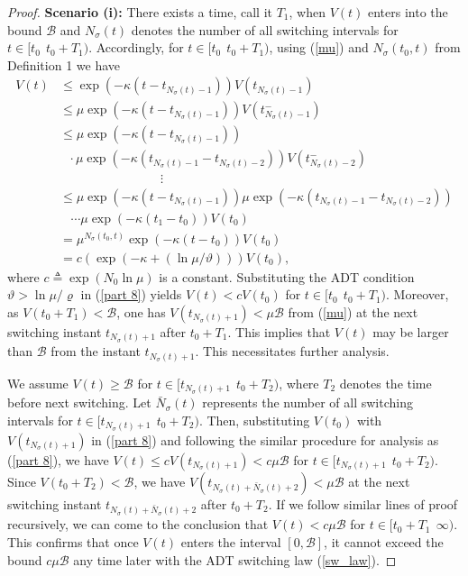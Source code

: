 \begin{proof}
	\textbf{Scenario (i):}
	There exists a time, call it $T_1$, when $V(t)$ enters into the bound $\mathcal{B}$ %
	and $N_{\sigma}(t)$ denotes the number of all switching intervals for $t \in [t_0 ~~t_0+T_1)$. Accordingly, for $t \in [t_0 ~~t_0+T_1)$, using (\ref{mu}) and $N_{\sigma}(t_0,t)$ from Definition 1 we have
	\begin{align}
	V(t)   &\leq \exp \left( - \kappa (t-t_{N_\sigma(t)-1})\right) V(t_{N_\sigma(t)-1}) \nonumber\\
	& \leq \mu\exp \left( - \kappa (t-t_{N_\sigma(t)-1})\right) V(t_{N_\sigma(t)-1}^{-}) \nonumber\\
	& \leq \mu\exp \left( - \kappa (t-t_{N_\sigma(t)-1})\right) \nonumber\\
	&~~~\cdot \mu\exp \left( - \kappa (t_{N_\sigma(t)-1}-t_{N_\sigma(t)-2}) \right)V(t_{N_\sigma(t)-2}^{-}) \nonumber\\
	&\qquad \qquad \qquad \qquad \vdots \nonumber\\
	&\leq \mu\exp \left( - \kappa (t-t_{N_\sigma(t)-1})\right)  \mu\exp \left( - \kappa (t_{N_\sigma(t)-1}-t_{N_\sigma(t)-2}) \right) \nonumber\\
	&~~ ~~\cdots \mu \exp \left( - \kappa (t_1-t_0) \right) V(t_0) \nonumber\\
	&= \mu^{N_{\sigma}(t_0,t)} \exp \left(- \kappa (t-t_0) \right)V(t_0)  \nonumber \\
	& = c \left( \exp \left( -\kappa + ({\ln \mu}/{\vartheta}) \right) \right)V(t_0), \label{part 8}
	\end{align}
	where $c \triangleq \exp \left( N_0 \ln \mu \right) $ is a constant. Substituting the ADT condition $\vartheta > \ln\mu / \varrho $ in (\ref{part 8}) yields $V(t) < c V(t_0)$ for $t \in [t_0 ~~t_0+T_1)$. Moreover, as $V(t_0 +T_1) < \mathcal{B}$, one has $V(t_{N_\sigma(t)+1}) < \mu \mathcal{B}$ from (\ref{mu}) at the next switching instant $t_{N_\sigma(t)+1}$ after $t_0+T_1$. This implies that $V(t)$ may be larger than $\mathcal{B}$ from the instant $t_{N_\sigma(t)+1}$. This necessitates further analysis.
	
	We assume $V(t) \geq \mathcal{B}$ for $t \in [t_{ N_\sigma(t)+1}~~ t_0+T_2)$, where $T_2$ denotes the time before next switching. Let $\bar{{N}}_\sigma (t)$ represents the number of all switching intervals for $t \in [t_{N_\sigma(t)+1}~~ t_0+T_2)$. Then, substituting $V(t_0)$ with $V(t_{N_\sigma (t)+1})$ in (\ref{part 8}) and following the similar procedure for analysis as (\ref{part 8}), we have $V(t) \leq c V(t_{ N_\sigma(t)+1}) < c \mu \mathcal{B}$ for $t \in [t_{ N_\sigma (t)+1}~~ t_0+T_2)$. Since $V(t_0+T_2) < \mathcal{B}$, we have $V(t_{ N_\sigma(t)+\bar{ N}_\sigma(t)+2}) < \mu \mathcal{B}$ at the next switching instant $t_{ N_\sigma(t)+\bar{ N}_\sigma(t)+2}$ after $t_0+T_2$. If we follow similar lines of proof recursively, we can come to the conclusion that $V(t) < c \mu \mathcal{B} $ for $t \in [t_0+T_1~~ \infty )$. This confirms that once $V(t)$ enters the interval $[0,\mathcal{B}]$, it cannot exceed the bound $c\mu \mathcal{B}$ any time later with the ADT switching law (\ref{sw_law}).
	

\end{proof}
